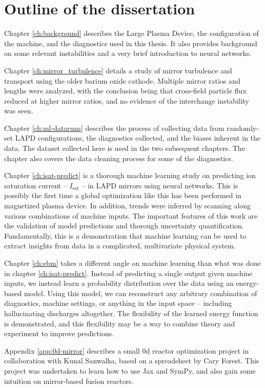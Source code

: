 \section{Outline of the dissertation}
Chapter \ref{ch:background} describes the Large Plasma Device, the configuration of the machine, and the diagnostics used in this thesis. It also provides background on some relevant instabilities and a very brief introduction to neural networks. 

Chapter \ref{ch:mirror_turbulence} details a study of mirror turbulence and transport using the older barium oxide cathode. Multiple mirror ratios and lengths were analyzed, with the conclusion being that cross-field particle flux reduced at higher mirror ratios, and no evidence of the interchange instability was seen.

Chapter \ref{ch:ml-dataruns} describes the process of collecting data from randomly-set LAPD configurations, the diagnostics collected, and the biases inherent in the data. The dataset collected here is used in the two subsequent chapters. The chapter also covers the data cleaning process for some of the diagnostics. 

Chapter \ref{ch:isat-predict} is a thorough machine learning study on predicting ion saturation current -- $I_\text{sat}$ -- in LAPD mirrors using neural networks. This is possibly the first time a global optimization like this has been performed in magnetized plasma device. In addition, trends were inferred by scanning along various combinations of machine inputs. The important features of this work are the validation of model predictions and thorough uncertainty quantification. Fundamentally, this is a demonstration that machine learning can be used to extract insights from data in a complicated, multivariate physical system. 

Chapter \ref{ch:ebm} takes a different angle on machine learning than what was done in chapter \ref{ch:isat-predict}. Instead of predicting a single output given machine inputs, we instead learn a probability distribution over the data using an energy-based model. Using this model, we can reconstruct any arbitrary combination of diagnostics, machine settings, or anything in the input space -- including hallucinating discharges altogether. The flexibility of the learned energy function is demonstrated, and this flexibility may be a way to combine theory and experiment to improve predictions. 

Appendix \ref{app:0d-mirror} describes a small 0d reactor optimization project in collaboration with Kunal Sanwalka, based on a spreadsheet by Cary Forest. This project was undertaken to learn how to use Jax and SymPy, and also gain some intuition on mirror-based fusion reactors.

